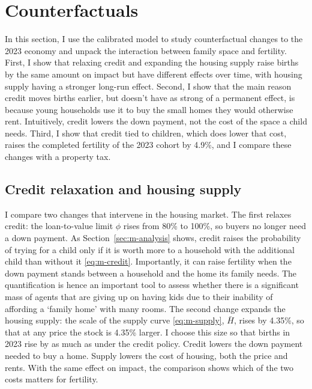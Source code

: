 \providecommand{\PRF}{../../output/model/experiments/housing_supply/20261021_paper_results}
\section{Counterfactuals}
\label{sec:policy}

In this section, I use the calibrated model to study counterfactual changes to
the 2023 economy and unpack the interaction between family space and
fertility. First, I show that relaxing credit and expanding the housing
supply raise births by the same amount on impact but have different effects
over time, with housing supply having a stronger long-run effect. Second, I show that the main reason credit moves births earlier, but doesn't have as strong of a permanent effect, is  because young
households use it to buy the small homes they would otherwise rent. Intuitively, credit lowers
the down payment, not the cost of the space a child needs. Third, I show that
credit tied to children, which does lower that cost, raises the completed
fertility of the 2023 cohort by 4.9\%, and I compare these changes with a
property tax.


\subsection{Credit relaxation and housing supply}
\label{sec:policy-design}

I compare two changes that intervene in the housing market. The first relaxes
credit: the loan-to-value limit $\phi$ rises from 80\% to 100\%, so buyers no
longer need a down payment. As Section~\ref{sec:m-analysis} shows, credit
raises the probability of trying for a child only if it is worth more to a
household with the additional child than without it \eqref{eq:m-credit}. Importantly, it
can raise fertility when the down payment stands between a household and the
home its family needs. The quantification is hence an important tool to assess whether there is a significant mass of agents that are giving up on having kids due to their inability of affording a `family home' with many rooms. The second change expands the housing supply: the scale of
the supply curve \eqref{eq:m-supply}, $\bar H$, rises by 4.35\%, so that at any price the stock
is 4.35\% larger. I choose this size so that births in 2023 rise by as
much as under the credit policy. Credit lowers the down payment needed to buy a home.
Supply lowers the cost of housing, both the price and rents. With the same
effect on impact, the comparison shows which of the two costs matters for
fertility.

